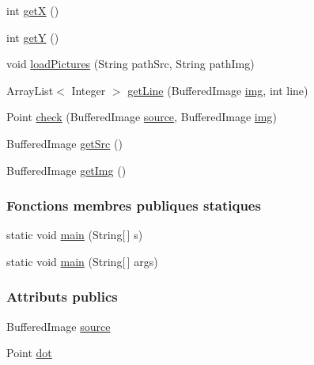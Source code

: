 \begin{DoxyCompactItemize}
\item 
int \hyperlink{classPictures_1_1FindPicture_a80c3dda20e857d68aceacba5f5e0022e}{get\+X} ()
\item 
int \hyperlink{classPictures_1_1FindPicture_a8f340bb45086f386e0a3b8f91bc34d7d}{get\+Y} ()
\item 
void \hyperlink{classPictures_1_1FindPicture_a120b1f81e5791d7316c6fb083dc64503}{load\+Pictures} (String path\+Src, String path\+Img)
\item 
Array\+List$<$ Integer $>$ \hyperlink{classPictures_1_1FindPicture_af6dbfb9eebba6ecaefb4c8c196cc3ccb}{get\+Line} (Buffered\+Image \hyperlink{classPictures_1_1FindPicture_aae63a27df999ed48e5af4c680c3d75ad}{img}, int line)
\item 
Point \hyperlink{classPictures_1_1FindPicture_ae35d4d083c06fda5960ec0f62ce47035}{check} (Buffered\+Image \hyperlink{classPictures_1_1FindPicture_a97e21e6354d181ae52c8b33ff3968128}{source}, Buffered\+Image \hyperlink{classPictures_1_1FindPicture_aae63a27df999ed48e5af4c680c3d75ad}{img})
\item 
Buffered\+Image \hyperlink{classPictures_1_1FindPicture_a7ffaa7ffcd58482dcc7050200a964608}{get\+Src} ()
\item 
Buffered\+Image \hyperlink{classPictures_1_1FindPicture_a8e72367088f376429ac47d29c8a3112f}{get\+Img} ()
\end{DoxyCompactItemize}
\subsubsection*{Fonctions membres publiques statiques}
\begin{DoxyCompactItemize}
\item 
static void \hyperlink{classPictures_1_1FindPicture_a8cc761670a5641a76490869d413beb30}{main} (String\mbox{[}$\,$\mbox{]} s)
\item 
static void \hyperlink{classPictures_1_1FindPicture_a84f0a150554946acb3e81c5e3fc7ba5f}{main} (String\mbox{[}$\,$\mbox{]} args)
\end{DoxyCompactItemize}
\subsubsection*{Attributs publics}
\begin{DoxyCompactItemize}
\item 
Buffered\+Image \hyperlink{classPictures_1_1FindPicture_a97e21e6354d181ae52c8b33ff3968128}{source}
\item 
Point \hyperlink{classPictures_1_1FindPicture_aa3ea544e21a97744534e323e3229899b}{dot}
\end{DoxyCompactItemize}
